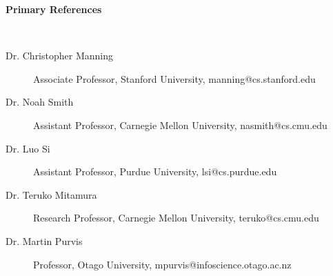 \documentclass[letterpaper,11pt]{article}
\begin{document}
\vspace{0.2in}
\begin{large}\textbf{Primary References}\end{large}\\
\vspace{-0.2in}
\begin{description}
\item[Dr. Christopher Manning] Associate Professor, Stanford University, manning@cs.stanford.edu
\item[Dr. Noah Smith] Assistant Professor, Carnegie Mellon University, nasmith@cs.cmu.edu
\item[Dr. Luo Si] Assistant Professor, Purdue University, lsi@cs.purdue.edu
\item[Dr. Teruko Mitamura] Research Professor, Carnegie Mellon University, teruko@cs.cmu.edu
\item[Dr. Martin Purvis] Professor, Otago University, mpurvis@infoscience.otago.ac.nz
\end{description}
\end{document}
